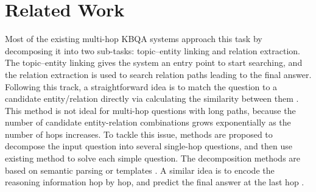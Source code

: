 \section{Related Work}

Most of the existing multi-hop KBQA systems %
approach this task by decomposing it into two sub-tasks:
topic--entity linking and relation extraction. The topic--entity linking gives the system an entry point to start searching, and the relation extraction is used to search relation paths leading to the final answer. %
Following this track, a straightforward idea is to match the question to a candidate entity/relation directly via calculating the similarity between them \cite{DBLP:journals/corr/abs-1801-09893,DBLP:conf/adbis/YuHYZW18,DBLP:conf/ijcai/LanW019}. This method is not ideal for multi-hop questions with long paths, because the number of candidate entity-relation combinations grows exponentially as the number of hops increases. To tackle this issue, methods are proposed to decompose the input question into several single-hop questions, and then use existing method to solve each simple question. The decomposition methods are based on semantic parsing \cite{DBLP:conf/www/AbujabalYRW17,DBLP:conf/emnlp/LuoLLZ18} or templates \cite{DBLP:journals/corr/abs-1908-11053}. A similar idea is to encode the reasoning information hop by hop, and predict the final answer at the last hop \cite{DBLP:conf/emnlp/MillerFDKBW16,DBLP:conf/coling/ZhouHZ18,DBLP:conf/naacl/ChenCCNK19}. %
